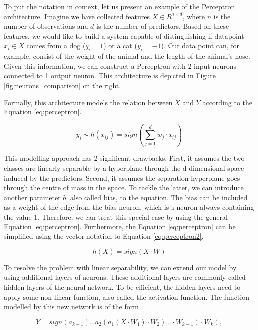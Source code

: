 To put the notation in context, let us present an example of the Perceptron architecture.
Imagine we have collected features $X \in R^{n \times d}$, where $n$ is the number of observations and $d$ is the number of predictors.
Based on these features, we would like to build a system capable of distinguishing if datapoint $x_i \in X$ comes from a dog ($y_i = 1$) or a cat ($y_i = -1$).
Our data point can, for example, consist of the weight of the animal and the length of the animal's nose.
Given this information, we can construct a Perceptron with 2 input neurons connected to 1 output neuron.
This architecture is depicted in Figure \ref{fig:neurons_comparison} on the right.

Formally, this architecture models the relation between $X$ and $Y$ according to the Equation \ref{eq:perceptron}. 

\begin{equation}
    y_i \sim h(x_{ij})= sign(\sum_{j=1}^{d} w_j \cdot x_{ij}) 
    \label{eq:perceptron}
\end{equation}

This modelling approach has 2 significant drawbacks.
First, it assumes the two classes are linearly separable by a hyperplane through the d-dimensional space induced by the predictors.
Second, it assumes the separation hyperplane goes through the centre of mass in the space.
To tackle the latter, we can introduce another parameter $b$, also called bias, to the equation.
The bias can be included as a weight of the edge from the bias neuron, which is a neuron always containing the value 1.
Therefore, we can treat this special case by using the general Equation \ref{eq:perceptron}.
Furthermore, the Equation \ref{eq:perceptron} can be simplified using the vector notation to Equation \ref{eq:perceptron2}.

\begin{equation}
    h(X) = sign(X \cdot W)
    \label{eq:perceptron2}
\end{equation}

To resolve the problem with linear separability, we can extend our model by using additional layers of neurons.
These additional layers are commonly called hidden layers of the neural network.
To be efficient, the hidden layers need to apply some non-linear function, also called the activation function.
The function modelled by this new network is of the form

\begin{equation}
    Y = sign(a_{k-1}(...a_2(a_1(X \cdot W_1) \cdot W_2)...\cdot W_{k-1}) \cdot W_{k}),
    \label{eq:perceptron3}
\end{equation}

